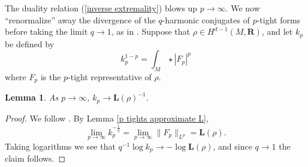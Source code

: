 \documentclass[reqno,11pt]{amsart}
\newcommand{\RR}{\mathbf{R}}
\newcommand{\Comass}{\mathbf L}
\newtheorem{lemma}[theorem]{Lemma}
\theoremstyle{definition}
\numberwithin{equation}{section}
\begin{document}
The duality relation (\ref{inverse extremality}) blows up $p \to \infty$.
We now ``renormalize'' away the divergence of the $q$-harmonic conjugates of $p$-tight forms before taking the limit $q \to 1$, as in \cite[\S3.2]{daskalopoulos2020transverse}.
Suppose that $\rho \in H^{d - 1}(M, \RR)$, and let $k_p$ be defined by 
$$k_p^{1 - p} = \int_M \star |F_p|^p$$
where $F_p$ is the $p$-tight representative of $\rho$.

\begin{lemma}\label{normalizations converge}
As $p \to \infty$, $k_p \to \Comass(\rho)^{-1}$.
\end{lemma}
\begin{proof}
We follow \cite[Lemma 3.4]{daskalopoulos2020transverse}.
By Lemma \ref{p tights approximate L},
$$\lim_{p \to \infty} k_p^{-\frac{1}{q}} = \lim_{p \to \infty} \|F_p\|_{L^p} = \Comass(\rho).$$
Taking logarithms we see that $q^{-1} \log k_p \to -\log \Comass(\rho)$, and since $q \to 1$ the claim follows.
\end{proof}
\end{document}
